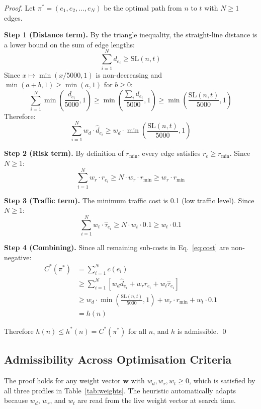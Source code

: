 ﻿\documentclass[a4paper, 12pt]{article}
\theoremstyle{remark}
\begin{document}
\begin{proof}
Let $\pi^* = (e_1, e_2, \ldots, e_N)$ be the optimal path from $n$ to $t$ with $N \geq 1$ edges.

\textbf{Step 1 (Distance term).}
By the triangle inequality, the straight-line distance is a lower bound on the sum of edge lengths:
\[
    \sum_{i=1}^{N} d_{e_i} \geq \text{SL}(n,t)
\]
Since $x \mapsto \min(x/5000, 1)$ is non-decreasing and $\min(a+b, 1) \geq \min(a,1)$ for $b \geq 0$:
\[
    \sum_{i=1}^{N} \min\!\left(\frac{d_{e_i}}{5000}, 1\right) \geq \min\!\left(\frac{\sum_i d_{e_i}}{5000}, 1\right) \geq \min\!\left(\frac{\text{SL}(n,t)}{5000}, 1\right)
\]
Therefore:
\[
    \sum_{i=1}^{N} w_d \cdot \hat{d}_{e_i} \geq w_d \cdot \min\!\left(\frac{\text{SL}(n,t)}{5000}, 1\right)
\]

\textbf{Step 2 (Risk term).}
By definition of $r_{\min}$, every edge satisfies $r_e \geq r_{\min}$. Since $N \geq 1$:
\[
    \sum_{i=1}^{N} w_r \cdot r_{e_i} \geq N \cdot w_r \cdot r_{\min} \geq w_r \cdot r_{\min}
\]

\textbf{Step 3 (Traffic term).}
The minimum traffic cost is 0.1 (low traffic level). Since $N \geq 1$:
\[
    \sum_{i=1}^{N} w_t \cdot \hat{\tau}_{e_i} \geq N \cdot w_t \cdot 0.1 \geq w_t \cdot 0.1
\]

\textbf{Step 4 (Combining).}
Since all remaining sub-costs in Eq.~\ref{eq:cost} are non-negative:
\begin{align*}
C^*(\pi^*) &= \sum_{i=1}^{N} c(e_i) \\
           &\geq \sum_{i=1}^{N} \left[w_d \hat{d}_{e_i} + w_r r_{e_i} + w_t \hat{\tau}_{e_i}\right] \\
           &\geq w_d \cdot \min\!\left(\frac{\text{SL}(n,t)}{5000}, 1\right) + w_r \cdot r_{\min} + w_t \cdot 0.1 \\
           &= h(n)
\end{align*}

Therefore $h(n) \leq h^*(n) = C^*(\pi^*)$ for all $n$, and $h$ is admissible. \qed
\end{proof}

\subsection{Admissibility Across Optimisation Criteria}

The proof holds for any weight vector $\mathbf{w}$ with $w_d, w_r, w_t \geq 0$, which is satisfied by all three profiles in Table~\ref{tab:weights}. The heuristic automatically adapts because $w_d$, $w_r$, and $w_t$ are read from the live weight vector at search time.
\end{document}
